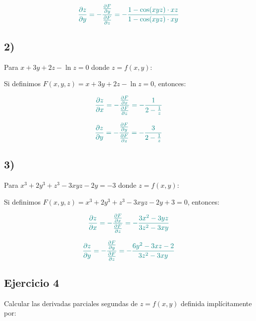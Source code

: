 \documentclass{article}
\begin{document}
  \begin{equation} \color{teal}
  \frac{\partial z}{\partial y} = -\frac{\frac{\partial F}{\partial y}}{\frac{\partial F}{\partial z}} = -\frac{1 - \cos(xyz) \cdot xz}{1 - \cos(xyz) \cdot xy}
  \end{equation}


  \subsection*{2)}
Para $x + 3y + 2z - \ln z = 0$ donde $z = f(x,y)$:
  
  Si definimos $F(x,y,z) = x + 3y + 2z - \ln z = 0$, entonces:
  
  \begin{equation} \color{teal}
  \frac{\partial z}{\partial x} = -\frac{\frac{\partial F}{\partial x}}{\frac{\partial F}{\partial z}} = -\frac{1}{2 - \frac{1}{z}}
  \end{equation}
  
  \begin{equation}\color{teal}
  \frac{\partial z}{\partial y} = -\frac{\frac{\partial F}{\partial y}}{\frac{\partial F}{\partial z}} = -\frac{3}{2 - \frac{1}{z}}
  \end{equation}
  \subsection*{3)}

  Para $x^3 + 2y^3 + z^3 - 3xyz - 2y = -3$ donde $z = f(x,y)$:
  
  Si definimos $F(x,y,z) = x^3 + 2y^3 + z^3 - 3xyz - 2y + 3 = 0$, entonces:
  
  \begin{equation}\color{teal}
  \frac{\partial z}{\partial x} = -\frac{\frac{\partial F}{\partial x}}{\frac{\partial F}{\partial z}} = -\frac{3x^2 - 3yz}{3z^2 - 3xy}
  \end{equation}
  
  \begin{equation}\color{teal}
  \frac{\partial z}{\partial y} = -\frac{\frac{\partial F}{\partial y}}{\frac{\partial F}{\partial z}} = -\frac{6y^2 - 3xz - 2}{3z^2 - 3xy}
  \end{equation}

\newpage
\subsection{Ejercicio 4}

Calcular las derivadas parciales segundas de \(z = f(x,y)\) definida implícitamente por:
\end{document}
